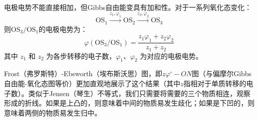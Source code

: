 \begin{proposition}[电极电势的计算]
电极电势不能直接相加，但Gibbs自由能变具有加和性。对于一系列氧化态变化：$$\text{OS}_1 \stackrel{z_1, \varphi_1}{\rightarrow} \text{OS}_2 \stackrel{z_2, \varphi_2}{\rightarrow} \text{OS}_3$$则$\text{OS}_3/\text{OS}_1$的电极电势为：
$$\varphi(\text{OS}_3/\text{OS}_1) = \frac{z_1\varphi_1 + z_2\varphi_2}{z_1 + z_2}$$
其中 $z_1$ 和 $z_2$ 为各步转移的电子数，$\varphi_1$、$\varphi_2$ 为对应的电极电势。
\end{proposition}

Frost（弗罗斯特）-Ebsworth（埃布斯沃思）图，即$z\varphi ^\circ-ON$图（与偏摩尔Gibbs自由能-氧化态图等价）更加直观地展示了这个结果（其中$z$指相对于单质转移的电子数）。类似于Jensen（琴生）不等式，我们只需要将需要的三个物质相连，观察形成的折线。如果是上凸的，则意味着中间的物质易发生歧化；如果是下凹的，则意味着两侧的物质易发生归中。

